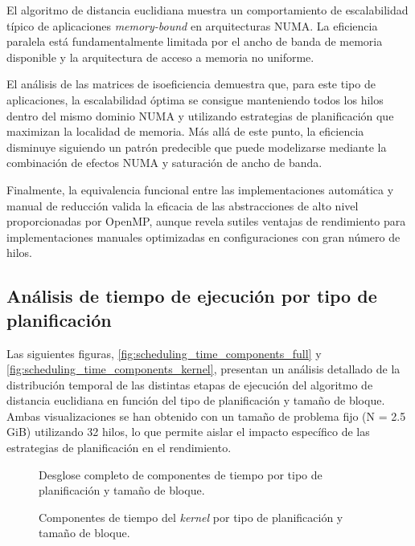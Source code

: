         El algoritmo de distancia euclidiana muestra un comportamiento de escalabilidad típico de aplicaciones \textit{memory-bound} en arquitecturas NUMA. La eficiencia paralela está fundamentalmente limitada por el ancho de banda de memoria disponible y la arquitectura de acceso a memoria no uniforme.
        
        El análisis de las matrices de isoeficiencia demuestra que, para este tipo de aplicaciones, la escalabilidad óptima se consigue manteniendo todos los hilos dentro del mismo dominio NUMA y utilizando estrategias de planificación que maximizan la localidad de memoria. Más allá de este punto, la eficiencia disminuye siguiendo un patrón predecible que puede modelizarse mediante la combinación de efectos NUMA y saturación de ancho de banda.
        
        Finalmente, la equivalencia funcional entre las implementaciones automática y manual de reducción valida la eficacia de las abstracciones de alto nivel proporcionadas por OpenMP, aunque revela sutiles ventajas de rendimiento para implementaciones manuales optimizadas en configuraciones con gran número de hilos.

    \subsection{Análisis de tiempo de ejecución por tipo de planificación}
    
        Las siguientes figuras, \autoref{fig:scheduling_time_components_full} y \autoref{fig:scheduling_time_components_kernel}, presentan un análisis detallado de la distribución temporal de las distintas etapas de ejecución del algoritmo de distancia euclidiana en función del tipo de planificación y tamaño de bloque. Ambas visualizaciones se han obtenido con un tamaño de problema fijo (N = 2.5 GiB) utilizando 32 hilos, lo que permite aislar el impacto específico de las estrategias de planificación en el rendimiento.
    
        \begin{figure}[H]
            \centering
            \caption{Desglose completo de componentes de tiempo por tipo de planificación y tamaño de bloque.}
            \label{fig:scheduling_time_components_full}
        \end{figure}
        
        \begin{figure}[H]
            \centering
            \caption{Componentes de tiempo del \textit{kernel} por tipo de planificación y tamaño de bloque.}
            \label{fig:scheduling_time_components_kernel}
        \end{figure}
    
